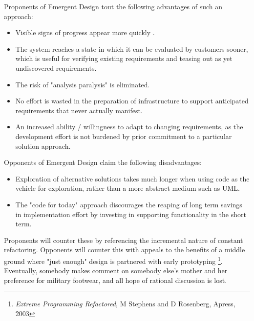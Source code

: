 \documentclass{article}
\begin{document}
Proponents of Emergent Design tout the following advantages of such an
approach:

\begin{itemize}
\item Visible signs of progress appear more quickly .
\item The system reaches a state in which it can be evaluated by customers
sooner, which is useful for verifying existing requirements and
teasing out as yet undiscovered requirements.\\
\item The risk of "analysis paralysis" is eliminated.
\item No effort is wasted in the preparation of infrastructure to support
anticipated requirements that never actually manifest.\\
\item An increased ability / willingness to adapt to changing requirements,
as the development effort is not burdened by prior commitment to a
particular solution approach.
\end{itemize}

Opponents of Emergent Design claim the following disadvantages:

\begin{itemize}
\item Exploration of alternative solutions takes much longer when using
code as the vehicle for exploration, rather than a more abstract
medium such as UML.\\
\item The "code for today" approach discourages the reaping of long term
savings in implementation effort by investing in supporting
functionality in the short term.
\end{itemize}

Proponents will counter these by referencing the incremental nature of
constant refactoring. Opponents will counter this with appeals to the
benefits of a middle ground where "just enough" design is partnered with
early prototyping \footnote{\emph{Extreme Programming Refactored}, M Stephens and D Rosenberg,
Apress, 2003}. Eventually, somebody makes comment on somebody
else's mother and her preference for military footwear, and all hope of
rational discussion is lost.
\end{document}
